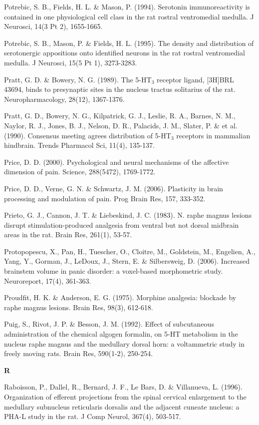 \documentclass[a4paper,12pt,twoside]{report}
\begin{document}
\begin{singlespacing}
\begin{footnotesize}
Potrebic, S. B., Fields, H. L. \& Mason, P. (1994). Serotonin immunoreactivity is contained in one physiological cell class in the rat rostral ventromedial medulla. J Neurosci, 14(3 Pt 2), 1655-1665.

Potrebic, S. B., Mason, P. \& Fields, H. L. (1995). The density and distribution of serotonergic appositions onto identified neurons in the rat rostral ventromedial medulla. J Neurosci, 15(5 Pt 1), 3273-3283.

Pratt, G. D. \& Bowery, N. G. (1989). The 5-HT$_{3}$ receptor ligand, [3H]BRL 43694, binds to presynaptic sites in the nucleus tractus solitarius of the rat. Neuropharmacology, 28(12), 1367-1376.

Pratt, G. D., Bowery, N. G., Kilpatrick, G. J., Leslie, R. A., Barnes, N. M., Naylor, R. J., Jones, B. J., Nelson, D. R., Palacids, J. M., Slater, P. \& et al. (1990). Consensus meeting agrees distribution of 5-HT$_{3}$ receptors in mammalian hindbrain. Trends Pharmacol Sci, 11(4), 135-137.

Price, D. D. (2000). Psychological and neural mechanisms of the affective dimension of pain. Science, 288(5472), 1769-1772.

Price, D. D., Verne, G. N. \& Schwartz, J. M. (2006). Plasticity in brain processing and modulation of pain. Prog Brain Res, 157, 333-352.

Prieto, G. J., Cannon, J. T. \& Liebeskind, J. C. (1983). N. raphe magnus lesions disrupt stimulation-produced analgesia from ventral but not dorsal midbrain areas in the rat. Brain Res, 261(1), 53-57.

Protopopescu, X., Pan, H., Tuescher, O., Cloitre, M., Goldstein, M., Engelien, A., Yang, Y., Gorman, J., LeDoux, J., Stern, E. \& Silbersweig, D. (2006). Increased brainstem volume in panic disorder: a voxel-based morphometric study. Neuroreport, 17(4), 361-363.

Proudfit, H. K. \& Anderson, E. G. (1975). Morphine analgesia: blockade by raphe magnus lesions. Brain Res, 98(3), 612-618.

Puig, S., Rivot, J. P. \& Besson, J. M. (1992). Effect of subcutaneous administration of the chemical algogen formalin, on 5-HT metabolism in the nucleus raphe magnus and the medullary dorsal horn: a voltammetric study in freely moving rats. Brain Res, 590(1-2), 250-254.

\medskip
\begin{Large}\textbf{R}\end{Large}

Raboisson, P., Dallel, R., Bernard, J. F., Le Bars, D. \& Villanueva, L. (1996). Organization of efferent projections from the spinal cervical enlargement to the medullary subnucleus reticularis dorsalis and the adjacent cuneate nucleus: a PHA-L study in the rat. J Comp Neurol, 367(4), 503-517.


\end{footnotesize}
\end{singlespacing}
\end{document}
